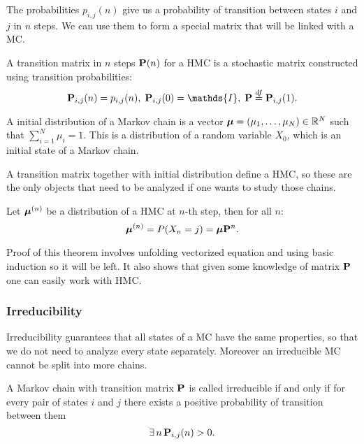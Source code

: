 	The probabilities $p_{i,j}(n)$ give us a probability of transition between states $i$ and $j$ in $n$  steps. We can use them to form a special matrix that will be linked with a MC.
	\begin{definition}
		A transition matrix in $n$ steps $\mathbf{P}(n)$ for a HMC is a stochastic matrix constructed using transition probabilities:
		\begin{equation*}
			\PP_{i,j}(n) = p_{i,j}(n), \; \PP_{i,j}(0) = \mathds{I}, \; \PP \overset{df}{=} \PP_{i,j}(1).
		\end{equation*}
	\end{definition}
	
	\begin{definition}
		A initial distribution of a Markov chain is a vector $\bm{\mu} = (\mu_1, \ldots, \mu_N) \in \mathbb{R}^N$ such that $\sum_{i=1}^{N} \mu_i = 1$. This is a distribution of a random variable $X_0$, which is an initial state of a Markov chain.
	\end{definition}

	A transition matrix together with initial distribution define a HMC, so these are the only objects that need to be analyzed if one wants to study those chains.
	
	\begin{theorem}
		Let $\bm{\mu}^{(n)}$ be a distribution of a HMC at $n$-th step, then for all $n$:
		\begin{equation*}
			\bm{\mu}^{(n)} = P(X_n = j) =  \bm{\mu} \mathbf{P}^n.
		\end{equation*}
	\end{theorem}
	Proof of this theorem involves unfolding vectorized equation and using basic induction so it will be left. It also shows that given some knowledge of matrix $\mathbf{P}$ one can easily work with HMC.
	
	\subsubsection{Irreducibility}
		Irreducibility guarantees that all states of a MC have the same properties, so that we do not need to analyze every state separately. Moreover an irreducible MC cannot be split into more chains.
		\begin{definition}[Irreducibility]
			A Markov chain with transition matrix $\mathbf{P}$ is called irreducible if and only if for every pair of states $i$ and $j$ there exists a positive probability of transition between them \ie
			\begin{equation*}
				\exists \, n \, \mathbf{P}_{i,j}(n) > 0.
			\end{equation*}
		\end{definition}
	
